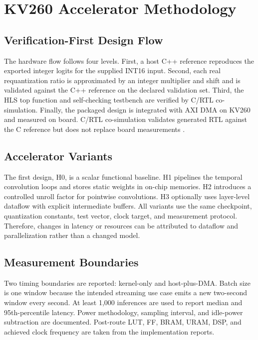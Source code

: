 \section{KV260 Accelerator Methodology}

\subsection{Verification-First Design Flow}

The hardware flow follows four levels. First, a host C++ reference reproduces
the exported integer logits for the supplied INT16 input. Second, each real
requantization ratio is approximated by an integer multiplier and shift and is
validated against the C++ reference on the declared validation set. Third, the
HLS top function and self-checking testbench are verified by C/RTL
co-simulation. Finally, the packaged design is integrated with AXI DMA on
KV260 and measured on board. C/RTL co-simulation validates generated RTL
against the C reference but does not replace board measurements
\cite{amd_hls_cosim}.

\subsection{Accelerator Variants}

The first design, H0, is a scalar functional baseline. H1 pipelines the
temporal convolution loops and stores static weights in on-chip memories. H2
introduces a controlled unroll factor for pointwise convolutions. H3 optionally
uses layer-level dataflow with explicit intermediate buffers. All variants use
the same checkpoint, quantization constants, test vector, clock target, and
measurement protocol. Therefore, changes in latency or resources can be
attributed to dataflow and parallelization rather than a changed model.

\subsection{Measurement Boundaries}

Two timing boundaries are reported: kernel-only and host-plus-DMA. Batch size
is one window because the intended streaming use case emits a new two-second
window every second. At least 1,000 inferences are used to report median and
95th-percentile latency. Power methodology, sampling interval, and idle-power
subtraction are documented. Post-route LUT, FF, BRAM, URAM, DSP, and achieved
clock frequency are taken from the implementation reports.
